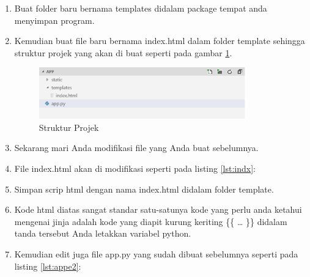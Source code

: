 \begin{enumerate}
\item Buat folder baru bernama templates didalam package tempat anda menyimpan program. 
\item Kemudian buat file baru bernama index.html dalam folder template sehingga struktur projek yang akan di buat seperti pada gambar \ref{fig:sp}.
\begin{figure}[!htbp]
	\centerline{\includegraphics[width=0.85\textwidth]{figures/13/sp.PNG}}
	\caption{Struktur Projek}
	\label{fig:sp}
\end{figure}

\item Sekarang mari  Anda modifikasi file yang  Anda buat sebelumnya. 
\item File index.html akan di modifikasi seperti pada listing \ref{lst:indx}:

 
\item Simpan scrip html dengan nama index.html didalam folder template.
\item Kode html diatas sangat standar satu-satunya kode yang perlu anda ketahui mengenai jinja adalah kode yang diapit kurung keriting \{\{ … \}\} didalam tanda tersebut  Anda letakkan variabel python. 
\item Kemudian edit juga file app.py yang sudah dibuat sebelumnya seperti pada listing \ref{lst:appe2}:

 

\end{enumerate}
